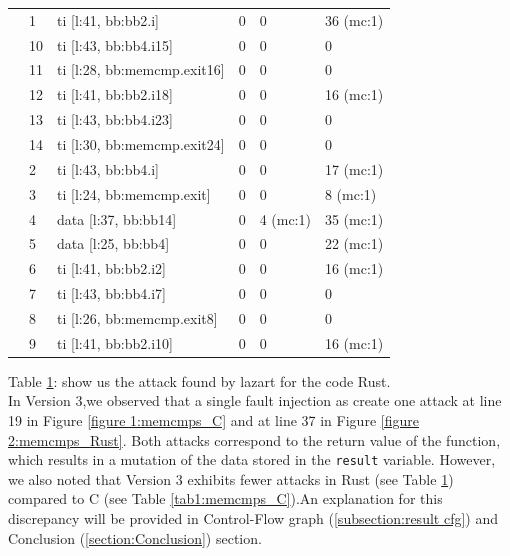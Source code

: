 \begin{table}[H]
{\begin{tabular}{l|l|l|l|l|l}
                    & 1  & ti [l:41, bb:bb2.i]         & 0       & 0        & 36 (mc:1)  \\
                    & 10 & ti [l:43, bb:bb4.i15]       & 0       & 0        & 0          \\
                    & 11 & ti [l:28, bb:memcmp.exit16] & 0       & 0        & 0          \\
                    & 12 & ti [l:41, bb:bb2.i18]       & 0       & 0        & 16 (mc:1)  \\
                    & 13 & ti [l:43, bb:bb4.i23]       & 0       & 0        & 0          \\
                    & 14 & ti [l:30, bb:memcmp.exit24] & 0       & 0        & 0          \\
                    & 2  & ti [l:43, bb:bb4.i]         & 0       & 0        & 17 (mc:1)  \\
                    & 3  & ti [l:24, bb:memcmp.exit]   & 0       & 0        & 8 (mc:1)   \\
                    & 4  & data [l:37, bb:bb14]        & 0       & 4 (mc:1) & 35 (mc:1)  \\
                    & 5  & data [l:25, bb:bb4]         & 0       & 0        & 22 (mc:1)  \\
                    & 6  & ti [l:41, bb:bb2.i2]        & 0       & 0        & 16 (mc:1)  \\
                    & 7  & ti [l:43, bb:bb4.i7]        & 0       & 0        & 0          \\
                    & 8  & ti [l:26, bb:memcmp.exit8]  & 0       & 0        & 0          \\
                    & 9  & ti [l:41, bb:bb2.i10]       & 0       & 0        & 16 (mc:1)  \\
            \bottomrule
        \end{tabular}
    }
    \label{tab2:memcmps_Rust}
    \end{table}

\noindent Table \ref{tab2:memcmps_Rust}: show us the attack found by lazart for the code Rust.\\

In Version 3,we observed that a single fault injection as create one attack at line 19 in Figure \ref{figure 1:memcmps_C} and at line 37 in Figure \ref{figure 2:memcmps_Rust}. Both attacks correspond to the return value of the function, which results in a mutation of the data stored in the \texttt{result} variable.
However, we also noted that Version 3 exhibits fewer attacks in Rust (see Table \ref{tab2:memcmps_Rust}) compared to C (see Table \ref{tab1:memcmps_C}).An explanation for this discrepancy will be provided in Control-Flow graph (\ref{subsection:result cfg}) and Conclusion (\ref{section:Conclusion}) section.


